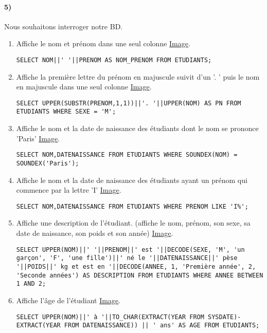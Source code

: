 \documentclass{report}
\begin{document}
\paragraph{5)}Nous souhaitons interroger notre BD.
\begin{enumerate}
	\item Affiche le nom et prénom dans une seul colonne \href{run:./Images/TP3/tp3_5.png}{Image}.
	\begin{lstlisting}
SELECT NOM||' '||PRENOM AS NOM_PRENOM FROM ETUDIANTS;
	\end{lstlisting}
	\item Affiche la première lettre du prénom en majuscule suivit d'un '. ' puis le nom en majuscule dans une seul colonne \href{run:./Images/TP3/tp3_6.png}{Image}.
	\begin{lstlisting}
SELECT UPPER(SUBSTR(PRENOM,1,1))||'. '||UPPER(NOM) AS PN FROM ETUDIANTS WHERE SEXE = 'M';
	\end{lstlisting}
	\item Affiche le nom et la date de naissance des étudiants dont le nom se prononce 'Paris' \href{run:./Images/TP3/tp3_7.png}{Image}.
	\begin{lstlisting}
SELECT NOM,DATENAISSANCE FROM ETUDIANTS WHERE SOUNDEX(NOM) = SOUNDEX('Paris');	
	\end{lstlisting}
	\item Affiche le nom et la date de naissance des étudiants ayant un prénom qui commence par la lettre 'I' \href{run:./Images/TP3/tp3_8.png}{Image}.
	\begin{lstlisting}
SELECT NOM,DATENAISSANCE FROM ETUDIANTS WHERE PRENOM LIKE 'I%';	
	\end{lstlisting}
	\item Affiche une description de l'étudiant. (affiche le nom, prénom, son sexe, sa date de naissance, son poids et son année) \href{run:./Images/TP3/tp3_9.png}{Image}.
	\begin{lstlisting}
SELECT UPPER(NOM)||' '||PRENOM||' est '||DECODE(SEXE, 'M', 'un garçon', 'F', 'une fille')||' né le '||DATENAISSANCE||' pèse '||POIDS||' kg et est en '||DECODE(ANNEE, 1, 'Première année', 2, 'Seconde années') AS DESCRIPTION FROM ETUDIANTS WHERE ANNEE BETWEEN 1 AND 2;	
	\end{lstlisting}
	\item Affiche l'âge de l'étudiant \href{run:./Images/TP3/tp3_10.png}{Image}.
	\begin{lstlisting}
SELECT UPPER(NOM)||' à '||TO_CHAR(EXTRACT(YEAR FROM SYSDATE)-EXTRACT(YEAR FROM DATENAISSANCE)) || ' ans' AS AGE FROM ETUDIANTS;	
	\end{lstlisting}
\end{enumerate}
\end{document}
